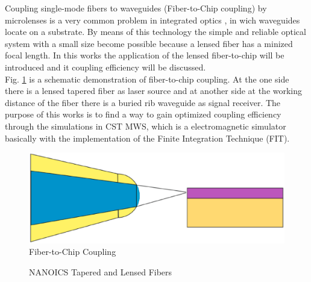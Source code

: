 Coupling single-mode fibers to waveguides (Fiber-to-Chip coupling) by microlenses is a very common problem in integrated optics \cite{ integrated_optics}, in wich waveguides locate on a substrate. By means of this technology the simple and reliable optical system with a small size become possible because a lensed fiber has a minized focal length. In this works the application of the lensed fiber-to-chip will be introduced and it coupling efficiency will be discussed.\\
Fig. \ref{fig:experiment_object} is a schematic demonstration of fiber-to-chip coupling. At the one side there is a lensed tapered fiber as laser source and at another side at the working distance of the fiber there is a buried rib waveguide\cite{integrated_optics} as signal receiver. The purpose of this works is to find a way to gain optimized coupling efficiency through the simulations in CST MWS, which is a electromagnetic simulator basically with the implementation of the Finite Integration Technique (FIT)\cite{cst_help_siulation_method}. 


\begin{figure}[!ht]
\centering
\includegraphics[width=.7\textwidth]{bilder/experiment_object}
\caption{Fiber-to-Chip Coupling}
\label{fig:experiment_object}
\end{figure}

\begin{figure}[!ht]
\centering
{}
\hfill
{}
\label{fig:TLFs}
\caption{NANOICS Tapered and Lensed Fibers}
\end{figure}


